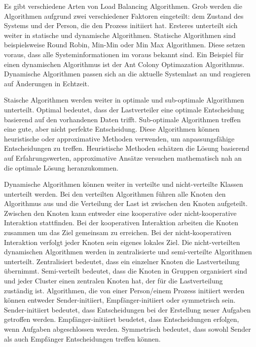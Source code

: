 \documentclass[a4paper,12pt]{article}
\begin{document}
Es gibt verschiedene Arten von Load Balancing Algorithmen. Grob werden die Algorithmen aufgrund zwei verschiedener Faktoren eingeteilt: dem Zustand des Systems und der Person, die den Prozess initiiert hat. 
Ersteres unterteilt sich weiter in statische und dynamische Algorithmen. Statische Algorithmen sind beispielsweise Round Robin, Min-Min oder Min Max Algorithmen. Diese setzen voraus, dass alle Systeminformationen im voraus bekannt sind. Ein Beispiel für einen dynamischen Algorithmus ist der Ant Colony Optimazation Algorithmus. Dynamische Algorithmen passen sich an die aktuelle Systemlast an und reagieren auf Änderungen in Echtzeit. 

Staische Algorithmen werden weiter in optimale und sub-optimale Algorithmen unterteilt. Optimal bedeutet, dass der Lastverteiler eine optimale Entscheidung basierend auf den vorhandenen Daten trifft. Sub-optimale Algorithmen treffen eine gute, aber nicht perfekte Entscheidung. Diese Algorithmen können heuristische oder approximative Methoden verwenden, um anpassungsfähige Entscheidungen zu treffen. Heuristische Methoden schätzen die Lösung basierend auf Erfahrungswerten, approximative Ansätze versuchen mathematisch nah an die optimale Lösung heranzukommen. 

Dynamische Algorithmen können weiter in verteilte und nicht-verteilte Klassen unterteilt werden. Bei den verteilten Algorithmen führen alle Knoten den Algorithmus aus und die Verteilung der Last ist zwischen den Knoten aufgeteilt. Zwischen den Knoten kann entweder eine kooperative oder nicht-kooperative Interaktion stattfinden. Bei der kooperativen Interaktion arbeiten die Knoten zusammen um das Ziel gemeinsam zu erreichen. Bei der nicht-kooperativen Interaktion verfolgt jeder Knoten sein eigenes lokales Ziel. Die nicht-verteilten dynamischen Algorithmen werden in zentralisierte und semi-verteilte Algorithmen unterteilt. Zentralisiert bedeutet, dass ein einzelner Knoten die Lastverteilung übernimmt. Semi-verteilt bedeutet, dass die Knoten in Gruppen organisiert sind und jeder Cluster einen zentralen Knoten hat, der für die Lastverteilung zuständig ist. 
\newline
Algorithmen, die von einer Person/einem Prozess initiiert werden können entweder Sender-initiiert, Empfänger-initiiert oder symmetrisch sein.
Sender-initiiert bedeutet, dass Entscheidungen bei der Erstellung neuer Aufgaben getroffen werden. Empfänger-initiiert beudetet, dass Entscheidungen erfolgen, wenn Aufgaben abgeschlossen werden. Symmetrisch bedeutet, dass sowohl Sender als auch Empfänger Entscheidungen treffen können. \cite[S. 3]{LoadBalancing}
\end{document}
